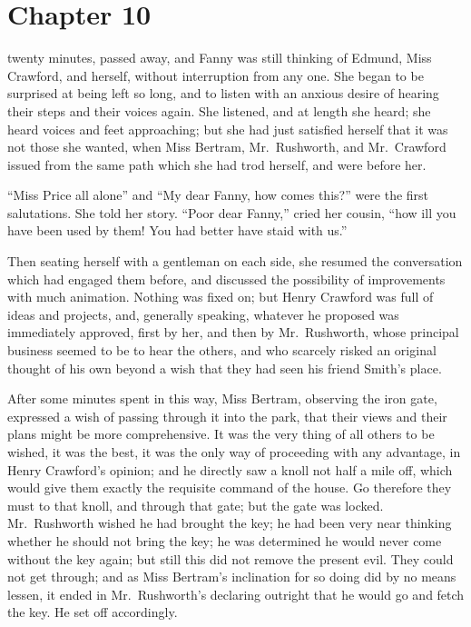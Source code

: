 \chapter{Chapter 10}

 twenty minutes, passed away,
and Fanny was still thinking of Edmund, Miss Crawford,
and herself, without interruption from any one.  She began
to be surprised at being left so long, and to listen
with an anxious desire of hearing their steps and their
voices again.  She listened, and at length she heard;
she heard voices and feet approaching; but she had just
satisfied herself that it was not those she wanted,
when Miss Bertram, Mr.\ Rushworth, and Mr.\ Crawford issued
from the same path which she had trod herself, and were
before her.

``Miss Price all alone'' and ``My dear Fanny, how comes this?''
were the first salutations.  She told her story.
``Poor dear Fanny,'' cried her cousin, ``how ill you have been
used by them!  You had better have staid with us.''

Then seating herself with a gentleman on each side,
she resumed the conversation which had engaged them before,
and discussed the possibility of improvements with
much animation.  Nothing was fixed on; but Henry Crawford
was full of ideas and projects, and, generally speaking,
whatever he proposed was immediately approved, first by her,
and then by Mr.\ Rushworth, whose principal business
seemed to be to hear the others, and who scarcely risked
an original thought of his own beyond a wish that they
had seen his friend Smith's place.

After some minutes spent in this way, Miss Bertram,
observing the iron gate, expressed a wish of passing
through it into the park, that their views and their
plans might be more comprehensive.  It was the very thing
of all others to be wished, it was the best, it was
the only way of proceeding with any advantage, in Henry
Crawford's opinion; and he directly saw a knoll not half
a mile off, which would give them exactly the requisite
command of the house.  Go therefore they must to that knoll,
and through that gate; but the gate was locked.
Mr.\ Rushworth wished he had brought the key; he had been
very near thinking whether he should not bring the key;
he was determined he would never come without the key again;
but still this did not remove the present evil.  They could
not get through; and as Miss Bertram's inclination for so
doing did by no means lessen, it ended in Mr.\ Rushworth's
declaring outright that he would go and fetch the key.
He set off accordingly.

